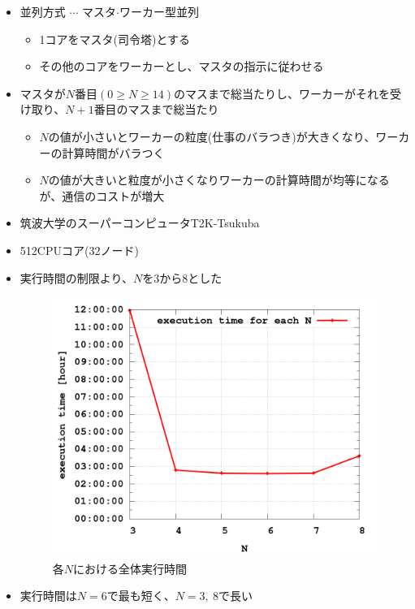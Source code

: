 \documentclass[a4paper,landscape,25pt]{foils}
\begin{document}
\begin{itemize}
\item 並列方式 $\cdots$ マスタ$\cdot$ワーカー型並列
\begin{itemize}
\item 1コアをマスタ(司令塔)とする
\item その他のコアをワーカーとし、マスタの指示に従わせる
\end{itemize}
\end{itemize}

\begin{itemize}
\item マスタが$N$番目$(0 \ge N \ge 14)$のマスまで総当たりし、ワーカーがそれを受け取り、$N+1$番目のマスまで総当たり
\begin{itemize}
\item $N$の値が小さいとワーカーの粒度(仕事のバラつき)が大きくなり、ワーカーの計算時間がバラつく
\item $N$の値が大きいと粒度が小さくなりワーカーの計算時間が均等になるが、通信のコストが増大
\end{itemize}
\end{itemize}

\begin{itemize}
\item 筑波大学のスーパーコンピュータT2K-Tsukuba
\item 512CPUコア(32ノード)
\end{itemize}

\begin{itemize}
\item 実行時間の制限より、$N$を3から8とした
\newpage
\begin{figure}[htb]
\centering
\includegraphics[height=0.75\textheight]{image3}
\caption{各$N$における全体実行時間}
\end{figure}
\item 実行時間は$N=6$で最も短く、$N=3, \ 8$で長い
\end{itemize}
\end{document}
